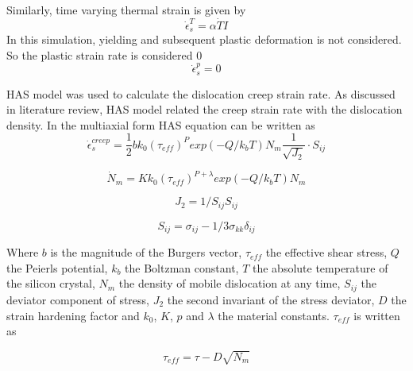 Similarly, time varying thermal strain is given by
\[ \dot{\epsilon}^{T}_{s} = \alpha \dot{T} I \] 
In this simulation, yielding and subsequent plastic deformation is not considered. So the plastic strain rate is considered 0
\[ \dot{\epsilon}^{p}_{s} = 0 \]

HAS model was used to calculate the dislocation creep strain rate. As discussed in literature review, HAS model related the creep strain rate with the dislocation density. In the multiaxial form HAS equation can be written as
\begin{equation} 
\dot{\epsilon}^{creep}_{s} = \frac{1}{2} b k_{0} (\tau_{eff})^{P} exp(-Q/k_{b}T) N_{m}
\frac{1}{\sqrt{J_{2}}} \cdot S_{ij}
\label {HAS_Eq}
\end{equation}
 
\[ \dot{N}_{m} = K k_{0} (\tau_{eff})^{P+\lambda} exp(-Q/k_{b}T) N_{m}  \] 
  
 
\[ J_{2} = 1/S_{ij}S_{ij} \]

\[ S_{ij} = \sigma_{ij} -1/3\sigma_{kk} \delta_{ij} \]

Where $b$ is the magnitude of the Burgers vector, $\tau_{eff}$ the effective shear stress, $Q$ the Peierls potential, $k_{b}$ the Boltzman constant, $T$ the absolute temperature of the silicon crystal, $N_{m}$ the density of mobile dislocation at any time, $S_{ij}$ the deviator component of stress, $J_{2}$ the second invariant of the stress deviator, $D$ the strain hardening factor and $k_{0}$, $K$, $p$ and $\lambda$ the material constants. $\tau_{eff}$ is written as

\begin{equation}
   \tau_{eff} = \tau -  D\sqrt{N_{m}} \label{tau_eff2}
\end{equation}

